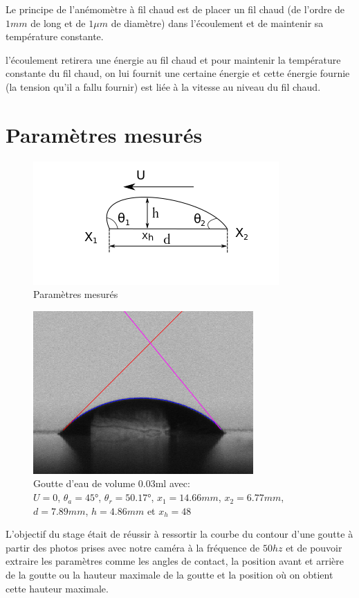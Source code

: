 \documentclass[french]{article}
\begin{document}
Le principe de l'anémomètre à fil chaud est de placer un fil chaud (de l'ordre de $1mm$ de long et de $1\mu m$ de diamètre) dans l'écoulement et de maintenir sa température constante.

l'écoulement retirera une énergie au fil chaud et pour maintenir la température constante du fil chaud, on lui fournit une certaine énergie et cette énergie fournie (la tension qu'il a fallu fournir) est liée à la vitesse au niveau du fil chaud.


\section{Paramètres mesurés}

\begin{figure}[!ht]
	\centering
	\includegraphics[scale = 1]{./image/rrgou2.png}
	\caption{Paramètres mesurés}
\end{figure}
\begin{figure}[!ht]
	\centering
	\includegraphics[scale = 0.5]{./image/crop_tvitesse=28_volume=003.png}
	\caption{Goutte d'eau de volume $0.03$ml avec: \\$U = 0$, $\theta_{a} = \ang{45}$, $\theta_{r} = \ang{50.17}$, $x_{1} = 14.66mm$, $x_{2} = 6.77mm$,\\ $d = 7.89mm$, $h = 4.86mm$ et $x_{h} = 48$}
\end{figure}


L'objectif du stage était de réussir à ressortir la courbe du contour d'une goutte à partir des photos prises avec notre caméra à la fréquence de $50hz$ et de pouvoir extraire les paramètres comme les angles de contact, la position avant et arrière de la goutte ou la hauteur maximale de la goutte et la position où on obtient cette hauteur maximale.
\end{document}
